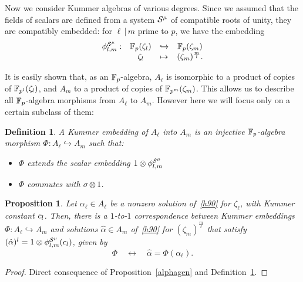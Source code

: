 \documentclass{sig-alternate}
\newtheorem{proposition}[theorem]{Proposition}
\newtheorem{definition}[theorem]{Definition}
\begin{document}
Now we consider Kummer algebras of various degrees.
Since we assumed that the fields of scalars are defined from a system $\mathcal{S}^\mu$
of compatible roots of unity,
they are compatibly embedded:
for $\ell\,|\,m$ prime to $p$, we have the embedding
\[
\begin{array}{cccc}
  {\phi^{\mathcal{S}^\mu}_{{l},{m}}}: & \mathbb{F}_{p}(\zeta_l) & \hookrightarrow & \mathbb{F}_{p}(\zeta_m) \\
  & \zeta_l & \mapsto & (\zeta_{m})^{\frac{m}{l}}.
\end{array}
\]

It is easily shown that, as an $\mathbb{F}_{p}$-algebra, $A_\ell$ is isomorphic to a product of copies of $\mathbb{F}_{p^l}(\zeta_l)$,
and $A_m$ to a product of copies of $\mathbb{F}_{p^m}(\zeta_m)$.
This allows us to describe all $\mathbb{F}_{p}$-algebra morphisms from $A_\ell$ to $A_m$. However here we will focus only on a certain
subclass of them:
\begin{definition}
\label{Kembedding}
A \emph{Kummer embedding} of $A_\ell$ into $A_m$ is an \emph{injective} $\mathbb{F}_{p}$-algebra morphism $\Phi:A_\ell\hookrightarrow A_m$
such that:
\begin{itemize}
\item $\Phi$ extends the scalar embedding $1\otimes{\phi^{\mathcal{S}^\mu}_{{l},{m}}}$
\item $\Phi$ commutes with $\sigma\otimes1$.
\end{itemize}
\end{definition}

\begin{proposition}
\label{Phialpha}
Let $\alpha_\ell\in A_\ell$ be a nonzero solution of~\eqref{h90} for $\zeta_\ell$, with Kummer constant $c_l$.
Then, there is a $1$-to-$1$ correspondence between Kummer embeddings $\Phi:A_\ell\hookrightarrow A_m$ and solutions $\hat{\alpha}\in A_m$
of~\eqref{h90} for $(\zeta_m)^{\frac{m}{\ell}}$ that satisfy $(\hat{\alpha})^l=1\otimes{\phi^{\mathcal{S}^\mu}_{{l},{m}}}(c_l)$,
given by \[ \Phi\quad\longleftrightarrow\quad\hat{\alpha}=\Phi(\alpha_\ell). \]
\end{proposition}
\begin{proof}
Direct consequence of Proposition~\ref{alphagen} and Definition~\ref{Kembedding}.
\end{proof}
\end{document}
